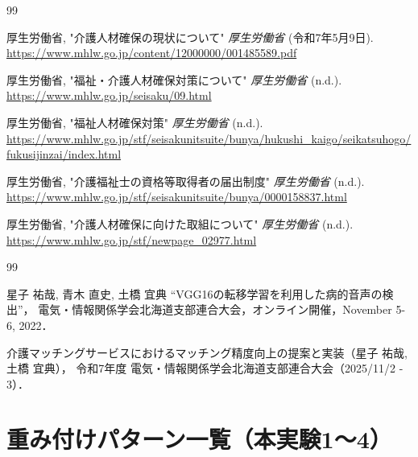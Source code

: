 \documentclass[11pt,a4paper,report,ja=standard,lualatex]{bxjsreport}
\begin{document}
\clearpage
\renewcommand{\bibname}{参考文献}
\begin{thebibliography}{99}

厚生労働省, "介護人材確保の現状について" \textit{厚生労働省} (令和7年5月9日). \href{https://www.mhlw.go.jp/content/12000000/001485589.pdf}{https://www.mhlw.go.jp/content/12000000/001485589.pdf}

厚生労働省, "福祉・介護人材確保対策について" \textit{厚生労働省} (n.d.). \href{https://www.mhlw.go.jp/seisaku/09.html}{https://www.mhlw.go.jp/seisaku/09.html}

厚生労働省, "福祉人材確保対策" \textit{厚生労働省} (n.d.). \href{https://www.mhlw.go.jp/stf/seisakunitsuite/bunya/hukushi_kaigo/seikatsuhogo/fukusijinzai/index.html}{https://www.mhlw.go.jp/stf/seisakunitsuite/bunya/hukushi\_kaigo/seikatsuhogo/fukusijinzai/index.html}

厚生労働省, "介護福祉士の資格等取得者の届出制度" \textit{厚生労働省} (n.d.). \href{https://www.mhlw.go.jp/stf/seisakunitsuite/bunya/0000158837.html}{https://www.mhlw.go.jp/stf/seisakunitsuite/bunya/0000158837.html}

厚生労働省, "介護人材確保に向けた取組について" \textit{厚生労働省} (n.d.). \href{https://www.mhlw.go.jp/stf/newpage_02977.html}{https://www.mhlw.go.jp/stf/newpage\_02977.html}

\end{thebibliography}

\renewcommand{\bibname}{研究業績}
\begin{thebibliography}{99}

星子 祐哉, 青木 直史, 土橋 宜典
``VGG16の転移学習を利用した病的音声の検出''，
電気・情報関係学会北海道支部連合大会，オンライン開催，November 5-6, 2022．

介護マッチングサービスにおけるマッチング精度向上の提案と実装（星子 祐哉, 土橋 宜典），
令和7年度 電気・情報関係学会北海道支部連合大会（2025/11/2 - 3）．

\end{thebibliography}

\clearpage
\appendix
\chapter{重み付けパターン一覧（本実験1〜4）}
\label{app:weight-patterns}

\end{document}
